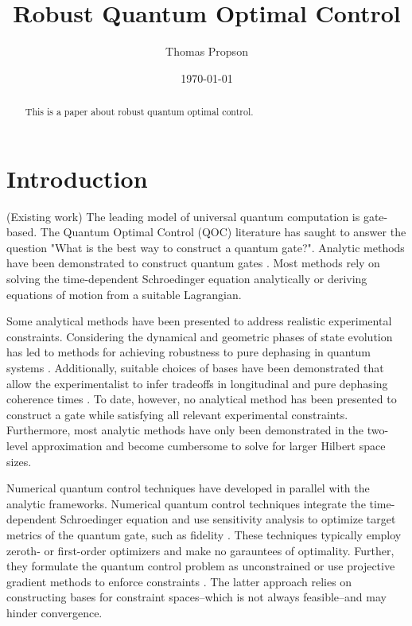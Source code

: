 \documentclass[
  amsfonts,
  amsmath,
  tbtags,
  amssymb,
  aps,
  nobibnotes,
  twocolumn,
]{revtex4-2}
\begin{document}
\title{Robust Quantum Optimal Control}

\author{Thomas Propson}

\date{\today}


\begin{abstract}
  This is a paper about robust quantum optimal control.
\end{abstract}

\maketitle


\section{Introduction}
(Existing work) The leading model of universal
quantum computation is gate-based. The Quantum Optimal Control (QOC)
literature has saught to answer the question "What is the best way to construct a quantum gate?".
Analytic methods
have been demonstrated to construct quantum gates
\cite{zhang2020universal, huang2020engineering, han2020experimental,
  xu2020nonadiabatic, carlini2005quantum}.
Most methods rely on solving the time-dependent
Schroedinger equation analytically or deriving equations of motion
from a suitable Lagrangian.

Some analytical methods
have been presented to address realistic experimental constraints.
Considering the dynamical and geometric phases of state
evolution has led to methods for achieving
robustness to pure dephasing in quantum systems
\cite{xu2020nonadiabatic, han2020experimental, merrill2014progress}.
Additionally, suitable choices of bases have been demonstrated that
allow the experimentalist to infer tradeoffs in longitudinal
and pure dephasing coherence times \cite{huang2020engineering}.
To date, however, no analytical method has been presented
to construct a gate while satisfying all relevant experimental
constraints. Furthermore, most analytic methods have only
been demonstrated in the two-level approximation and become
cumbersome to solve for larger Hilbert space sizes.

Numerical quantum control techniques have developed in parallel
with the analytic frameworks. Numerical quantum control
techniques integrate the time-dependent Schroedinger
equation and use sensitivity analysis to optimize target metrics
of the quantum gate, such as fidelity
\cite{leung2017speedup,  goerz2019krotov, doria2011optimal,
  abdelhafez2019gradient, machnes2015gradient, leng2019robust}.
These techniques typically employ zeroth- or first-order
optimizers and make no garauntees of optimality.
Further, they formulate the quantum control
problem as unconstrained or use
projective gradient methods to enforce constraints
\cite{machnes2015gradient}.
The latter approach relies on constructing
bases for constraint spaces--which is not always feasible--and
may hinder convergence.
\end{document}
